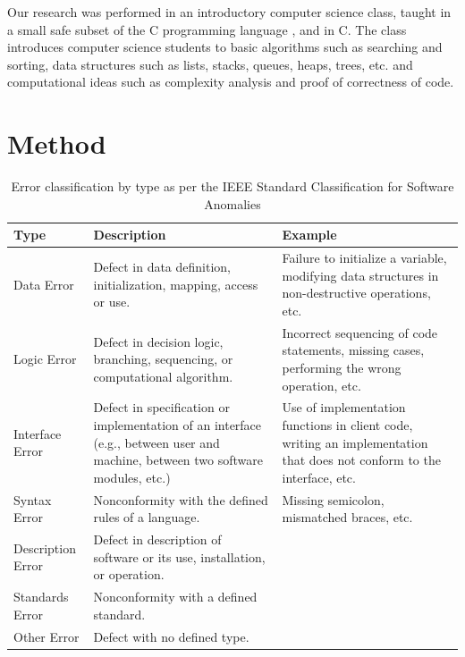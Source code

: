 \documentclass{sig-alternate}
\begin{document}
Our research was performed in an introductory computer science class, taught in a small safe subset of the C programming language \cite{Arnold10}, and in C. The class introduces computer science students to basic algorithms such as searching and sorting, data structures such as lists, stacks, queues, heaps, trees, etc. and computational ideas such as complexity analysis and proof of correctness of code.

\section{Method}
\label{sec:method}

\begin{table}
\def\arraystretch{1.6}
\centering
\caption{Error classification by type as per the IEEE Standard Classification for Software Anomalies \cite{IEEE10}}
\label{table:IEEE}
\begin{tabular}{|p{1in}|p{2.9in}|p{2.6in}|} \hline
\textbf{Type} & \textbf{Description} & \textbf{Example}\\ \hline
Data Error&
Defect in data definition, initialization, mapping, access or use.&
Failure to initialize a variable, modifying data structures in non-destructive operations, etc.\\ \hline

Logic Error&
Defect in decision logic, branching, sequencing, or computational algorithm.&
Incorrect sequencing of code statements, missing cases, performing the wrong operation, etc.\\ \hline

Interface Error&
Defect in specification or implementation of an interface (e.g., between user and machine, between two software modules, etc.)&
Use of implementation functions in client code, writing an implementation that does not conform to the interface, etc.\\ \hline

Syntax Error&
Nonconformity with the defined rules of a language.&
Missing semicolon, mismatched braces, etc.\\ \hline

Description Error&
Defect in description of software or its use, installation, or operation.&
\\ \hline

Standards Error&
Nonconformity with a defined standard.&
\\ \hline

Other Error&
Defect with no defined type.
&
\\ \hline
\end{tabular}
\end{table}
\end{document}
